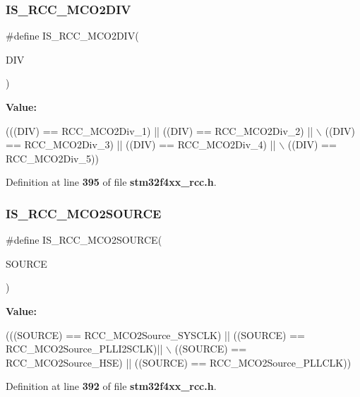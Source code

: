 \subsubsection{I\+S\+\_\+\+R\+C\+C\+\_\+\+M\+C\+O2\+D\+IV}
{\footnotesize\ttfamily \#define I\+S\+\_\+\+R\+C\+C\+\_\+\+M\+C\+O2\+D\+IV(\begin{DoxyParamCaption}\item[{}]{D\+IV }\end{DoxyParamCaption})}

{\bfseries Value\+:}
\begin{DoxyCode}
(((DIV) == RCC_MCO2Div_1) || ((DIV) == RCC_MCO2Div_2) || \(\backslash\)
                             ((DIV) == RCC_MCO2Div_3) || ((DIV) == RCC_MCO2Div_4) || \(\backslash\)
                             ((DIV) == RCC_MCO2Div_5))
\end{DoxyCode}


Definition at line \textbf{ 395} of file \textbf{ stm32f4xx\+\_\+rcc.\+h}.

\mbox{\label{group__RCC__MCO2__Clock__Source__Prescaler_ga99f4a9acbacb5e4d2b27bb9f4f2c0a2f}} 
\subsubsection{I\+S\+\_\+\+R\+C\+C\+\_\+\+M\+C\+O2\+S\+O\+U\+R\+CE}
{\footnotesize\ttfamily \#define I\+S\+\_\+\+R\+C\+C\+\_\+\+M\+C\+O2\+S\+O\+U\+R\+CE(\begin{DoxyParamCaption}\item[{}]{S\+O\+U\+R\+CE }\end{DoxyParamCaption})}

{\bfseries Value\+:}
\begin{DoxyCode}
(((SOURCE) == RCC_MCO2Source_SYSCLK) || ((SOURCE) == RCC_MCO2Source_PLLI2SCLK)|| \(\backslash\)
                                   ((SOURCE) == RCC_MCO2Source_HSE) || ((SOURCE) == 
      RCC_MCO2Source_PLLCLK))
\end{DoxyCode}


Definition at line \textbf{ 392} of file \textbf{ stm32f4xx\+\_\+rcc.\+h}.

